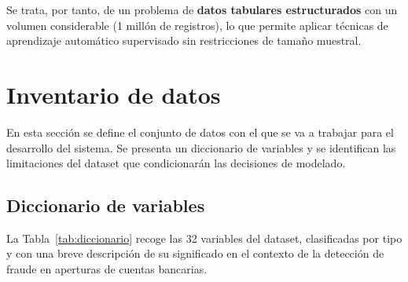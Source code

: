 \documentclass[12pt,a4paper]{report}
\begin{document}
Se trata, por tanto, de un problema de \textbf{datos tabulares estructurados} con un volumen considerable (1 millón de registros), lo que permite aplicar técnicas de aprendizaje automático supervisado sin restricciones de tamaño muestral.

\section{Inventario de datos}
\label{sec:h2_inventario}

En esta sección se define el conjunto de datos con el que se va a trabajar para el desarrollo del sistema. Se presenta un diccionario de variables y se identifican las limitaciones del dataset que condicionarán las decisiones de modelado.

\subsection{Diccionario de variables}

La Tabla~\ref{tab:diccionario} recoge las 32 variables del dataset, clasificadas por tipo y con una breve descripción de su significado en el contexto de la detección de fraude en aperturas de cuentas bancarias.
\end{document}

